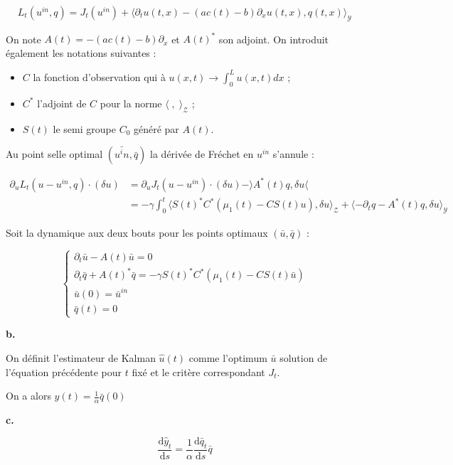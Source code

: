 \documentclass[a4paper]{article}
\newcommand{\Y}{\mathscr{Y}}
\newcommand{\Z}{\mathscr{Z}}
\begin{document}
\[ L_t(u^{in},q) = J_t(u^{in}) + \langle \partial_t u(t,x) - (ac(t)-b) \partial_x u(t,x), q(t,x) \rangle_{\Y} \]

On note $A(t) = - (ac(t)-b) \partial_x $ et $A(t)^*$ son adjoint.
On introduit également les notations suivantes :
\begin{itemize}
	\item $C$ la fonction d'observation qui à $u(x,t) \to \int_0^L u(x,t)dx$ ;
	\item $C^*$ l'adjoint de $C$ pour la norme $\langle \;, \; \rangle_{\Z}$ ;
	\item $S(t)$ le semi groupe $C_0$ généré par $A(t)$.
\end{itemize}
Au point selle optimal $(\bar{u^in}, \bar{q})$ la dérivée de Fréchet en $u^{in}$ s'annule :

\[ \begin{split}
\partial_{u}L_t(u-u^{in},q) \cdot (\delta u) &= \partial_u J_t(u-u^{in}) \cdot (\delta u)  - \rangle A^*(t)q , \delta u \langle \\
                                      &= - \gamma \int_0^t \langle S(t)^*C^* (\mu_1(t) - CS(t)u ), \delta u \rangle_{\Z} 
										 + \langle - \partial_t q - A^*(t)q , \delta u \rangle_{\Y}
\end{split}\]

Soit la dynamique aux deux bouts pour les points optimaux $(\bar{u},\bar{q})$ :

\[
\begin{cases}
	\partial_t \bar{u} - A(t)\bar{u} =0 \\
	\partial_t \bar{q} + A(t)^* \bar{q} = - \gamma S(t)^*C^* (\mu_1(t) - CS(t)\bar{u} ) \\
	\bar{u}(0) = \bar{u}^{in}\\
	\bar{q}(t) = 0
\end{cases}
\]
	
\textbf{b.}

On définit l'estimateur de Kalman $\hat{u}(t)$ 
comme l'optimum $\bar{u}$ solution de l'équation précédente pour $t$ fixé
et le critère correspondant $J_t$.

On a alors $\hat{y}(t) = \displaystyle \frac{1}{\alpha} \bar{q}(0)$

\textbf{c.}

\[
\displaystyle \frac{\mathrm{d} \hat{y}_t }{\mathrm{d}s} = \frac{1}{\alpha} \frac{\mathrm{d}\bar{q}_t}{\mathrm{d}s} \bar{q} 
\]

\end{document}
